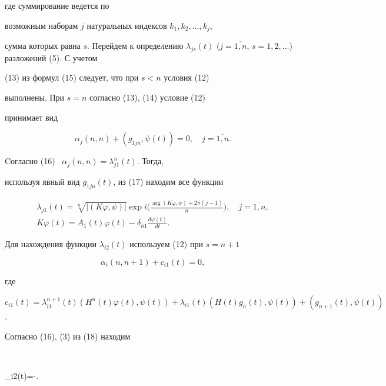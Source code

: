 где суммирование ведется по


возможным наборам $j$ натуральных индексов $k_{1},k_{2},\dotsc, k_{j}$,


сумма которых равна $s$. Перейдем к определению $\lambda


_{js}(t)$ ($j=\overline{1,n}$, $s=1,2,\dotsc$) разложений (5). С учетом


(13) из формул (15) следует, что при $s< n$ условия (12)


выполнены. При $s=n$ согласно (13), (14) условие (12)


принимает вид


\begin{equation}


\alpha_{j}(n,n)+(g_{1jn},\psi (t))=0,\quad j=\overline{1,n}.


\end{equation}


Cогласно (16) \ $\alpha_{j}(n,n)=\lambda^{n}_{j1}(t)$. Тогда,


используя явный вид $g_{1jn}(t)$, из (17) находим все функции


\begin{gather*}


\lambda_{j1}(t)=\sqrt[n]{|(K\varphi,\psi)|}\exp i


\bigg(\frac{\arg(K\varphi,\psi)+2\pi(j-1)}{n}\bigg),\quad j=\overline{1,n},\\


%


K\varphi(t) = A_{1}(t)\varphi (t)-\delta _{h1}\frac{d\varphi(t)}{dt}.


\end{gather*}


Для нахождения функции $\lambda_{i2}(t)$ используем (12) при $s=n+1$


\begin{equation}


\alpha_{i}(n,n+1)+c_{i1}(t)=0,


\end{equation} 


где


$c_{i1}(t)=\lambda_{i1}^{n+1}(t)(H^{n}(t)\varphi(t),\psi(t))+\lambda_{i1}(t)


(H(t)g_{n}(t),\psi(t))+(g_{n+1}(t),\psi(t))$.


Согласно (16), (3) из (18) находим


$$


\lambda_{i2}(t)=-.


